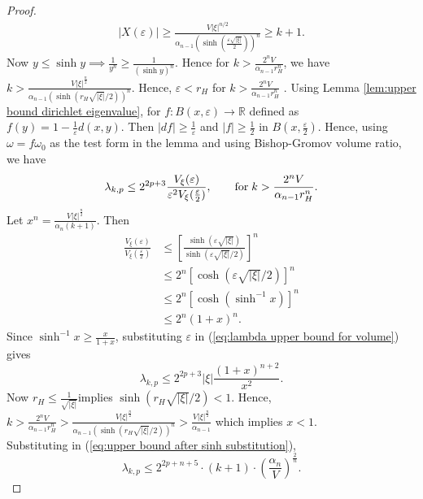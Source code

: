 \documentclass[10 pt, reqno]{amsart}
\begin{document}
\begin{proof}
\begin{align}
|X(\varepsilon)|\ge 
\frac{V |\xi|^{n/2}}
{\alpha_{n-1}
\left(
\sinh\left(\frac{\varepsilon \sqrt{|\xi|}}{2}\right)
\right)^n} \ge k+1.
\end{align}
Now $y\le \sinh{y}\implies \frac{1}{y^n}\ge \frac{1}{(\sinh y)^n}$. Hence for $k>\frac{2^nV}{\alpha_{n-1}r_H^n}$, we have $k>\frac{V|\xi|^\frac{n}{2}}{\alpha_{n-1}(\sinh(r_H\sqrt{|\xi|}/2))^n}.$ Hence,  $\varepsilon<r_H$ for $k>\frac{2^nV}{\alpha_{n-1}r_H^n}$ . Using Lemma \ref{lem:upper bound dirichlet eigenvalue}, for $f:B(x,\varepsilon)\rightarrow\mathbb{R}$ defined as $f(y)=1-\frac{1}{\varepsilon}d(x,y)$. Then $|df|\ge \frac{1}{\varepsilon}$ and $|f|\ge\frac{1}{2}$ in $B\left(x,\frac{\varepsilon}{2}\right)$. Hence, using $\omega=f\omega_0$ as the test form in the lemma and using Bishop-Gromov volume ratio, we have
\begin{equation}
    \label{eq:lambda upper bound for volume}
    \lambda_{k,p}\le 2^{2p+3}\frac{V_\xi(\varepsilon)}{\varepsilon^2 V_\xi(\frac{\varepsilon}{2})}, \qquad \mathrm{for}\hspace{1mm} k>\frac{2^nV}{\alpha_{n-1}r_H^n}.
\end{equation}
Let $x^n=\frac{ V|\xi|^\frac{n}{2}}{\alpha_n(k+1)}$. Then \begin{align}
    \frac{V_\xi(\varepsilon)}{ V_\xi(\frac{\varepsilon}{2})} &\le \left[\frac{\sinh\left(\varepsilon\sqrt{|\xi|}\right)}{\sinh\left(\varepsilon\sqrt{|\xi|}/2\right)}\right]^n \nonumber\\
    &\le 2^n\left[\cosh\left(\varepsilon\sqrt{|\xi|}/2\right)
    \right]^n \nonumber \\
    &\le 2^n\left[\cosh\left(\sinh^{-1}x\right)\right]^n \nonumber\\
    &\le 2^n\left(1+x\right)^n.
\end{align}
Since $\sinh^{-1}x\ge \frac{x}{1+x}$, substituting $\varepsilon$ in (\ref{eq:lambda upper bound for volume})  gives
\begin{equation}
\label{eq:upper bound after sinh substitution}
    \lambda_{k,p}\le 2^{2p+3}|\xi|\frac{(1+x)^{n+2}}{x^2}.
\end{equation}
Now $r_H\le \frac{1}{\sqrt{|\xi|}}$implies $\sinh \left(r_H\sqrt{|\xi|}/2\right)<1$. Hence,  $k>\frac{2^nV}{\alpha_{n-1}r_H^n}>\frac{V|\xi|^\frac{n}{2}}{\alpha_{n-1}(\sinh(r_H\sqrt{|\xi|}/2))^n}> \frac{V|\xi|^\frac{n}{2}}{\alpha_{n-1}}$ which implies $x<1.$\\

Substituting in (\ref{eq:upper bound after sinh substitution}),
\[ \lambda_{k,p}\le 2^{2p+n+5}\cdot (k+1)\cdot \left(\frac{\alpha_n}{V}\right)^\frac{2}{n}.\]

\end{proof}
\end{document}
